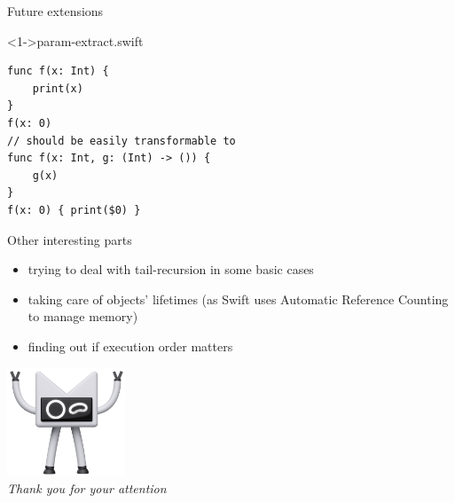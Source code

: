 \documentclass[hyperref={pdfpagelabels=false},xcolor={dvipsnames},compress,table,usenames,dvipsnames]{beamer}
\begin{document}
    \begin{frame}[fragile]{Future extensions}
        \begin{exampleblock}
            <1->{param-extract.swift}
            \begin{lstlisting}
func f(x: Int) {
    print(x)
}
f(x: 0)
// should be easily transformable to
func f(x: Int, g: (Int) -> ()) {
    g(x)
}
f(x: 0) { print($0) }
            \end{lstlisting}
        \end{exampleblock}
    \end{frame}

    \begin{frame}[fragile]{Other interesting parts}
        \begin{itemize}
            \item trying to deal with tail-recursion in some basic cases\pause
            \item taking care of objects' lifetimes (as Swift uses Automatic Reference Counting to manage memory)\pause
            \item finding out if execution order matters
        \end{itemize}
    \end{frame}

    {
        \begin{frame}{}
            \centering
            \includegraphics[width=100pt]{images/blink.png}\\\vspace{1cm}
            \emph{\Large Thank you for your attention}
        \end{frame}
    }
\end{document}
